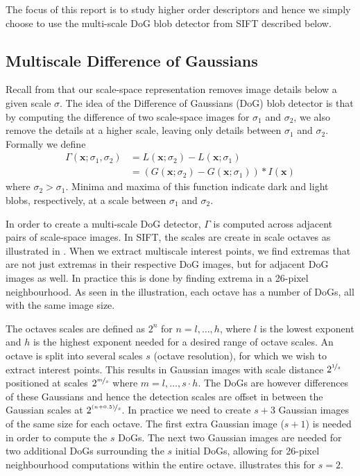 \documentclass[thesis.tex]{subfiles}
\def\x{\mathbf{x}}
\begin{document}
The focus of this report is to study higher order descriptors and hence we simply choose to use the multi-scale DoG blob detector from SIFT \cite{lowe2004distinctive} described below.

\subsection{Multiscale Difference of Gaussians}
\label{sec:multiscaleDoG}

Recall from  that our scale-space representation removes image details below a given scale $\sigma$. The idea of the Difference of Gaussians (DoG) blob detector is that by computing the difference of two scale-space images for $\sigma_1$ and $\sigma_2$, we also remove the details at a higher scale, leaving only details between $\sigma_1$ and $\sigma_2$. Formally we define
%
\begin{align*}
\Gamma(\x;\sigma_1,\sigma_2) &= L(\x;\sigma_2) - L(\x;\sigma_1) \\
&= \left( G(\x;\sigma_2) - G(\x;\sigma_1) \right) \ast I(\x)
\end{align*}
%
where $\sigma_2 > \sigma_1$. Minima and maxima of this function indicate dark and light blobs, respectively, at a scale between $\sigma_1$ and $\sigma_2$.

In order to create a multi-scale DoG detector, $\Gamma$ is computed across adjacent pairs of scale-space images. In SIFT, the scales are create in scale octaves as illustrated in . When we extract multiscale interest points, we find extremas that are not just extremas in their respective DoG images, but for adjacent DoG images as well. In practice this is done by finding extrema in a 26-pixel neighbourhood. As seen in the illustration, each octave has a number of DoGs, all with the same image size.

The octaves scales are defined as $2^n$ for $n = l,\hdots,h$, where $l$ is the lowest exponent and $h$ is the highest exponent needed for a desired range of octave scales. An octave is split into several scales $s$ (octave resolution), for which we wish to extract interest points. This results in Gaussian images with scale distance $2^{\nicefrac{1}{s}}$ positioned at scales $2^{\nicefrac{m}{s}}$ where $m = l,\hdots,s \cdot h$. The DoGs are however differences of these Gaussians and hence the detection scales are offset in between the Gaussian scales at $2^{\nicefrac{(n+0.5)}{s}}$.
In practice we need to create $s+3$ Gaussian images of the same size for each octave. The first extra Gaussian image ($s+1$) is needed in order to compute the $s$ DoGs. The next two Gaussian images are needed for two additional DoGs surrounding the $s$ initial DoGs, allowing for 26-pixel neighbourhood computations within the entire octave.  illustrates this for $s = 2$.
\end{document}
